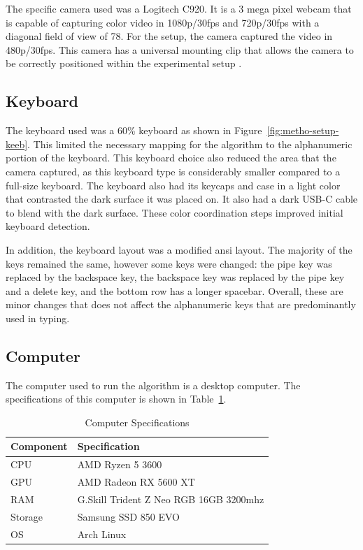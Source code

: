 \documentclass{report}
\begin{document}
The specific camera used was a Logitech C920. It is a 3 mega pixel webcam that
is capable of capturing color video in 1080p/30fps and 720p/30fps with a
diagonal field of view of 78\degree. For the setup, the camera captured the
video in 480p/30fps. This camera has a universal mounting clip that allows the
camera to be correctly positioned within the experimental setup
\parencite{logitech}.

\subsection{Keyboard}
\label{section:metho-keeb}

The keyboard used was a 60\% keyboard as shown in
Figure~\ref{fig:metho-setup-keeb}. This limited the necessary mapping for the
algorithm to the alphanumeric portion of the keyboard. This keyboard choice also
reduced the area that the camera captured, as this keyboard type is considerably
smaller compared to a full-size keyboard. The keyboard also had its keycaps and
case in a light color that contrasted the dark surface it was placed on. It also
had a dark USB-C cable to blend with the dark surface. These color coordination
steps improved initial keyboard detection.

In addition, the keyboard layout was a modified \ac{ansi} layout. The majority
of the keys remained the same, however some keys were changed: the pipe key was
replaced by the backspace key, the backspace key was replaced by the pipe key
and a delete key, and the bottom row has a longer spacebar. Overall, these are
minor changes that does not affect the alphanumeric keys that are predominantly
used in typing.

\subsection{Computer}
The computer used to run the algorithm is a desktop computer. The specifications
of this computer is shown in Table~\ref{tab:table-specs}.

\begin{table}[H]
	\small
	\centering
	\caption{\label{tab:table-specs}Computer Specifications}
	\begin{tabular}{ p{} p{} }
		\toprule
		Component & Specification                          \\
		\midrule
		CPU       & AMD Ryzen 5 3600                       \\
		GPU       & AMD Radeon RX 5600 XT                  \\
		RAM       & G.Skill Trident Z Neo RGB 16GB 3200mhz \\
		Storage   & Samsung SSD 850 EVO                    \\
		OS        & Arch Linux                             \\
		\bottomrule
	\end{tabular}
\end{table}
\end{document}
